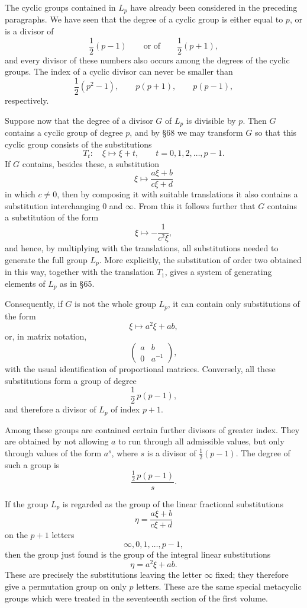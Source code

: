\documentclass[11pt,a4paper]{book}
\begin{document}
The cyclic groups contained in \(L_p\) have already been considered in the preceding paragraphs.  We have seen that the degree of a cyclic group is either equal to \(p\), or is a divisor of
\[
 \frac12(p-1)
 \qquad\text{or of}\qquad
 \frac12(p+1),
\]
and every divisor of these numbers also occurs among the degrees of the cyclic groups.  The index of a cyclic divisor can never be smaller than
\[
 \frac12(p^2-1),\qquad p(p+1),\qquad p(p-1),
\]
respectively.

Suppose now that the degree of a divisor \(G\) of \(L_p\) is divisible by \(p\).  Then \(G\) contains a cyclic group of degree \(p\), and by \S 68 we may transform \(G\) so that this cyclic group consists of the substitutions
\[
 T_t:\quad \xi\longmapsto \xi+t,\qquad t=0,1,2,\ldots,p-1 .
\]
If \(G\) contains, besides these, a substitution
\[
 \xi\longmapsto \frac{a\xi+b}{c\xi+d}
\]
in which \(c\ne0\), then by composing it with suitable translations it also contains a substitution interchanging \(0\) and \(\infty\).  From this it follows further that \(G\) contains a substitution of the form
\[
 \xi\longmapsto -\frac{1}{c^2\xi},
\]
and hence, by multiplying with the translations, all substitutions needed to generate the full group \(L_p\).  More explicitly, the substitution of order two obtained in this way, together with the translation \(T_1\), gives a system of generating elements of \(L_p\) as in \S 65.

Consequently, if \(G\) is not the whole group \(L_p\), it can contain only substitutions of the form
\[
 \xi\longmapsto a^2\xi+ab,
\]
or, in matrix notation,
\[
 \begin{pmatrix} a&b\\0&a^{-1}\end{pmatrix},
\]
with the usual identification of proportional matrices.  Conversely, all these substitutions form a group of degree
\[
 \frac12\,p(p-1),
\]
and therefore a divisor of \(L_p\) of index \(p+1\).

Among these groups are contained certain further divisors of greater index.  They are obtained by not allowing \(a\) to run through all admissible values, but only through values of the form \(a^s\), where \(s\) is a divisor of \(\frac12(p-1)\).  The degree of such a group is
\[
 \frac{\frac12\,p(p-1)}{s}.
\]

If the group \(L_p\) is regarded as the group of the linear fractional substitutions
\[
 \eta=\frac{a\xi+b}{c\xi+d}
\]
on the \(p+1\) letters
\[
 \infty,0,1,\ldots,p-1,
\]
then the group just found is the group of the integral linear substitutions
\[
 \eta=a^2\xi+ab .
\]
These are precisely the substitutions leaving the letter \(\infty\) fixed; they therefore give a permutation group on only \(p\) letters.  These are the same special metacyclic groups which were treated in the seventeenth section of the first volume.
\end{document}
